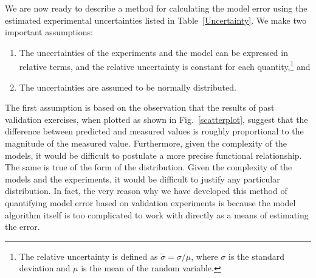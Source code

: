 We are now ready to describe a method for calculating the model error using the estimated experimental uncertainties
listed in Table~\ref{Uncertainty}.
We make two important assumptions:
\begin{enumerate}
\item The uncertainties of the experiments and the model can be expressed in
relative terms, and the relative uncertainty is constant for each quantity,\footnote{The relative uncertainty is defined as
$\widetilde{\sigma}=\sigma/\mu$, where $\sigma$ is the standard deviation and $\mu$ is the mean of the random variable.} and
\item The uncertainties are assumed to be normally distributed.
\end{enumerate}
The first assumption is based on the observation that the results of past validation exercises, when plotted as shown in Fig.~\ref{scatterplot}, suggest
that the difference between predicted and measured values is roughly proportional to the magnitude of the measured value. Furthermore, given the 
complexity of the models, it would be difficult to postulate a more precise functional relationship. 
The same is true of the form of the distribution. Given the complexity of the models and the experiments, it would be difficult to justify
any particular distribution. In fact, the very reason why we have developed this method of quantifying model error based on validation
experiments is because the model algorithm itself is too complicated to work with directly as a means of estimating the error. 

